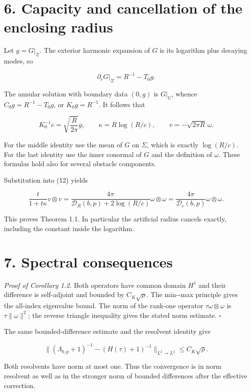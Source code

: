 \documentclass[11pt]{article}
\begin{document}
\section{6. Capacity and cancellation of the enclosing
radius}\label{capacity-and-cancellation-of-the-enclosing-radius}

Let \(g=G|_\Sigma\). The exterior harmonic expansion of \(G\) is its
logarithm plus decaying modes, so

\[\partial_rG|_\Sigma=R^{-1}-T_0g.\]

The annular solution with boundary data \((0,g)\) is \(G|_U\), whence
\(C_0g=R^{-1}-T_0g\), or \(K_0g=R^{-1}\). It follows that

\[K_0^{-1}e=\sqrt{\frac R{2\pi}}g,\qquad
\kappa=R\log(R/c),\qquad
v=-\sqrt{2\pi R}\,\omega.\tag{13}\]

For the middle identity use the mean of \(G\) on \(\Sigma\), which is
exactly \(\log(R/c)\). For the last identity use the inner conormal of
\(G\) and the definition of \(\omega\). These formulas hold also for
several obstacle components.

Substitution into (12) yields

\[\frac{t}{1+t\kappa}v\otimes v
=\frac{4\pi}{\mathcal D_R(b,p)+2\log(R/c)}\omega\otimes\omega
=\frac{4\pi}{\mathcal D_c(b,p)}\omega\otimes\omega.\]

This proves Theorem 1.1. In particular the artificial radius cancels
exactly, including the constant inside the logarithm.

\section{7. Spectral consequences}\label{spectral-consequences}

\emph{Proof of Corollary 1.2.} Both operators have common domain \(H^1\)
and their difference is self-adjoint and bounded by \(C_K\sqrt\rho\).
The min-\/-max principle gives the all-index eigenvalue bound. The norm
of the rank-one operator \(\tau\omega\otimes\omega\) is
\(\tau\|\omega\|^2\); the reverse triangle inequality gives the stated
norm estimate. \(\square\)

The same bounded-difference estimate and the resolvent identity give

\[\|(\Lambda_{b,p}+1)^{-1}-(H(\tau)+1)^{-1}\|_{L^2\to L^2}\leq C_K\sqrt\rho.\tag{14}\]

Both resolvents have norm at most one. Thus the convergence is in norm
resolvent as well as in the stronger norm of bounded differences after
the effective correction.
\end{document}
